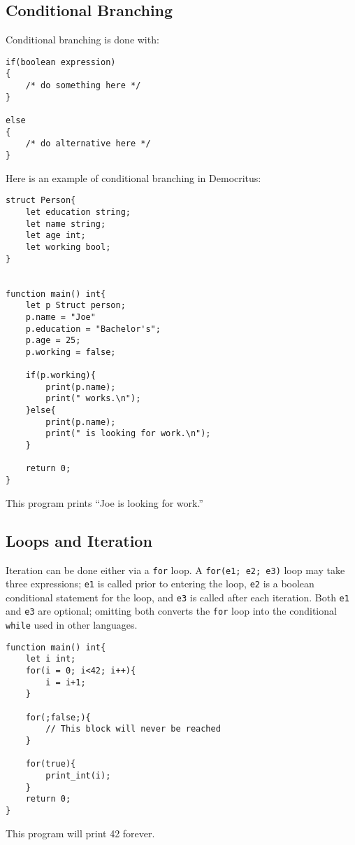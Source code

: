 	\subsection{Conditional Branching}
		Conditional branching is done with:

		\begin{lstlisting}
if(boolean expression) 
{ 
	/* do something here */
}

else
{
	/* do alternative here */
}
		\end{lstlisting}
	
		\medskip \noindent
		Here is an example of conditional branching in Democritus:

		\begin{lstlisting}
struct Person{
	let education string;
	let name string;
	let age int;
	let working bool;
}


function main() int{
	let p Struct person;
	p.name = "Joe"
	p.education = "Bachelor's";
	p.age = 25;
	p.working = false;

	if(p.working){
		print(p.name);
		print(" works.\n");
	}else{
		print(p.name);
		print(" is looking for work.\n");
	}

	return 0;
}
		\end{lstlisting}

		\medskip \noindent
		This program prints ``Joe is looking for work.''

	\subsection{Loops and Iteration}
		Iteration can be done either via a \texttt{for} loop. A \texttt{for(e1; e2; e3)} loop may take three expressions; \texttt{e1} is called prior to entering the loop, \texttt{e2} is a boolean conditional statement for the loop, and \texttt{e3} is called after each iteration. Both \texttt{e1} and \texttt{e3} are optional; omitting both converts the \texttt{for} loop into the conditional \texttt{while} used in other languages.

		\begin{lstlisting}
function main() int{
	let i int;
	for(i = 0; i<42; i++){
		i = i+1;
	}

	for(;false;){
		// This block will never be reached
	}

	for(true){
		print_int(i);
	}
	return 0;
}
		\end{lstlisting}

		\medskip \noindent
		This program will print 42 forever.



